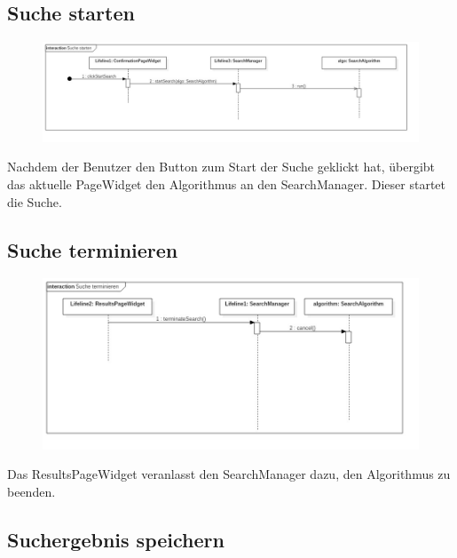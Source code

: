 \pagebreak

\subsection{Suche starten}

\begin{figure}[H]
\centering
\includegraphics[width=\linewidth]{img/Sequenzdiagramme/SucheStarten}
\label{fig:sucheStarten}
\end{figure}
Nachdem der Benutzer den Button zum Start der Suche geklickt hat, übergibt das aktuelle PageWidget den Algorithmus an den SearchManager. Dieser startet die Suche.

\subsection{Suche terminieren}

\begin{figure}[H]
\centering
\includegraphics[width=\linewidth]{img/Sequenzdiagramme/SucheTerminieren}
\label{fig:sucheTerminieren}
\end{figure}
Das ResultsPageWidget veranlasst den SearchManager dazu, den Algorithmus zu beenden.

\subsection{Suchergebnis speichern}

